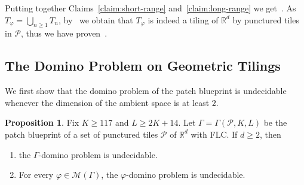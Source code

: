 \documentclass{article}
\theoremstyle{definition}
\newtheorem{prop}[theorem]{Proposition}
\theoremstyle{definition}
\newcommand{\RR}{\mathbb{R}}
\newcommand{\PP}{\mathcal{P}}
\begin{document}
    Putting together Claims~\ref{claim:short-range} and~\ref{claim:long-range} we get~. As $T_{\varphi} = \bigcup_{n \geq 1}T_n$, by~ we obtain that $T_{\varphi}$ is indeed a tiling of $\RR^d$ by punctured tiles in $\PP$, thus we have proven~.

\subsection{The Domino Problem on Geometric Tilings} We first show that the domino problem of the patch blueprint is undecidable whenever the dimension of the ambient space is at least $2$. 

\begin{prop}
\label{prop:patchdomino}
    Fix $K \geq 117$ and $L \geq 2K+14$. Let $\Gamma = \Gamma(\PP,K,L)$ be the patch blueprint of a set of punctured tiles $\PP$ of $\RR^d$ with FLC. If $d \geq 2$, then
    \begin{enumerate}
        \item the $\Gamma$-domino problem is undecidable.
        \item For every $\varphi \in \mathcal{M}(\Gamma)$, the $\varphi$-domino problem is undecidable.
    \end{enumerate}
\end{prop} 
\end{document}
